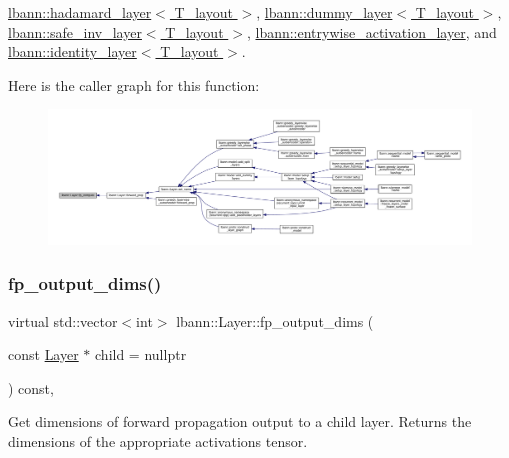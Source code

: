 \hyperlink{classlbann_1_1hadamard__layer_a8be44f24f2290b06b104294d1fe31d41}{lbann\+::hadamard\+\_\+layer$<$ T\+\_\+layout $>$}, \hyperlink{classlbann_1_1dummy__layer_a4d59be5e984ebd1d6d16d17bb26f3486}{lbann\+::dummy\+\_\+layer$<$ T\+\_\+layout $>$}, \hyperlink{classlbann_1_1safe__inv__layer_a070fe64c2a605eb5624d509740de1c32}{lbann\+::safe\+\_\+inv\+\_\+layer$<$ T\+\_\+layout $>$}, \hyperlink{classlbann_1_1entrywise__activation__layer_a2ec05802115c5f029fa106c88ada89db}{lbann\+::entrywise\+\_\+activation\+\_\+layer}, and \hyperlink{classlbann_1_1identity__layer_aaa19914b20bc409aa3fb8a744e994114}{lbann\+::identity\+\_\+layer$<$ T\+\_\+layout $>$}.

Here is the caller graph for this function\+:\nopagebreak
\begin{figure}[H]
\begin{center}
\leavevmode
\includegraphics[width=350pt]{classlbann_1_1Layer_a523319dd1bd87a0612afa1912bb5aad7_icgraph}
\end{center}
\end{figure}
\mbox{\label{classlbann_1_1Layer_a22d31298912405660ebb210c0d7c5373}} 
\subsubsection{\texorpdfstring{fp\+\_\+output\+\_\+dims()}{fp\_output\_dims()}}
{\footnotesize\ttfamily virtual std\+::vector$<$int$>$ lbann\+::\+Layer\+::fp\+\_\+output\+\_\+dims (\begin{DoxyParamCaption}\item[{const \hyperlink{classlbann_1_1Layer}{Layer} $\ast$}]{child = {\ttfamily nullptr} }\end{DoxyParamCaption}) const\hspace{0.3cm}{\ttfamily [inline]}, {\ttfamily [virtual]}}

Get dimensions of forward propagation output to a child layer. Returns the dimensions of the appropriate activations tensor. 

